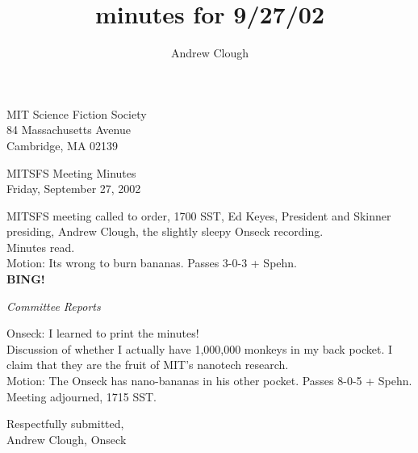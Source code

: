 \documentclass{article}
\title{minutes for 9/27/02}
\author{Andrew Clough}
\begin{document}
\begin{center}
MIT Science Fiction Society\\
84 Massachusetts Avenue\\
Cambridge, MA 02139\\
\end{center}
\begin{center}
MITSFS Meeting Minutes\\
Friday, September 27, 2002\\
\end{center}

MITSFS meeting called to order, 1700 SST, Ed Keyes, President and Skinner presiding, Andrew Clough, the slightly sleepy Onseck recording.\\

Minutes read.\\

Motion: Its wrong to burn bananas.  Passes 3-0-3 + Spehn.\\

\textbf{BING!}

\begin{center}
\textit{Committee Reports}\\
\end{center}

Onseck:  I learned to print the minutes!\\

Discussion of whether I actually have 1,000,000 monkeys in my back pocket.  I claim that they are the fruit of MIT's nanotech research.\\

Motion: The Onseck has nano-bananas in his other pocket.  Passes 8-0-5 + Spehn.\\

Meeting adjourned, 1715 SST.\\



\begin{center}
Respectfully submitted,\\
Andrew Clough, Onseck
\end{center}
\end{document}
